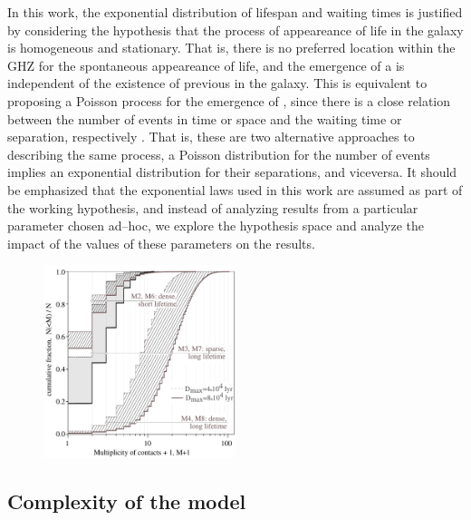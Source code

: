 In this work, the exponential distribution of lifespan and waiting
times is justified by considering the hypothesis that the process of
appeareance of life in the galaxy is homogeneous and stationary.
%
That is, there is no preferred location within the GHZ for the
spontaneous appeareance of life, and the emergence of a \ceti{} is
independent of the existence of previous \cetis{} in the galaxy.
%            
This is equivalent to proposing a Poisson process for the emergence of
\cetis{}, since there is a close relation between the number of events
in time or space and the waiting time or separation, respectively
\citep[e.g., ][]{ross_simulation_2012}.
%
That is, these are two alternative approaches to describing the same
process, a Poisson distribution for the number of events implies an
exponential distribution for their separations, and viceversa.
%
It should be emphasized that the exponential laws used in this work
are assumed as part of the working hypothesis, and instead of
analyzing results from a particular parameter chosen ad--hoc, we
explore the hypothesis space and analyze the impact of the values of
these parameters on the results.
 
 
\begin{figure} \centering
   \includegraphics[width=0.5\textwidth]{F_number_of_contacts.pdf}
    \label{F_number_of_contacts}
\end{figure}
        
 

\subsection{Complexity of the model}

